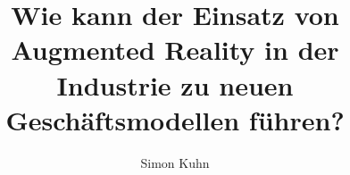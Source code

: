 \documentclass[conference]{IEEEtran}
\title{ Wie kann der Einsatz von Augmented Reality in der Industrie zu neuen Geschäftsmodellen führen?}
\author{{\Large Simon Kuhn}}
\begin{document}
\maketitle
\begin{abstract}
	\blindtext
\end{abstract}




 



\printbibliography
\end{document}
